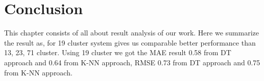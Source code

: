 \documentclass[document.tex]{subfiles}
\begin{document}
	\section{Conclusion}
	\noindent This chapter consists of all about result analysis of our work. Here we summarize the result as, for 19 cluster system gives us comparable better performance than 13, 23, 71 cluster. Using 19 cluster we got the MAE result 0.58 from DT approach and 0.64 from K-NN approach, RMSE 0.73 from DT approach and 0.75 from K-NN approach.
	
\end{document}
